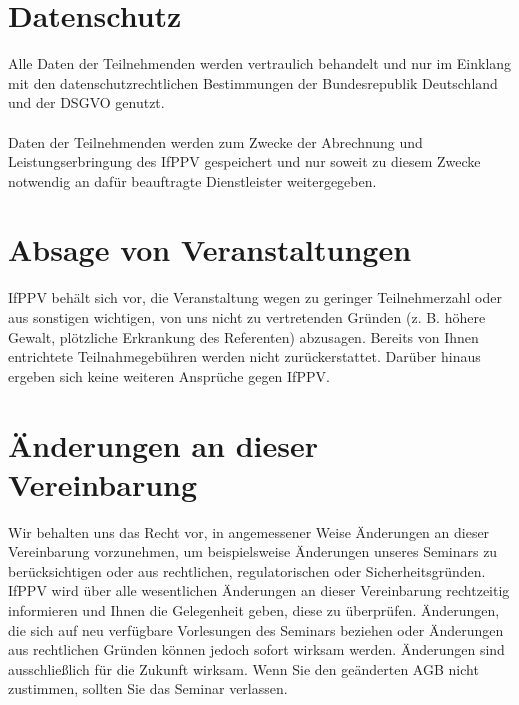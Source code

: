 \documentclass[a4paper, 12pt]{scrartcl}
\begin{document}
    \section{Datenschutz}
    Alle Daten der Teilnehmenden werden vertraulich behandelt und nur im Einklang mit den datenschutzrechtlichen Bestimmungen der Bundesrepublik Deutschland und der DSGVO genutzt. \\ \\ \noindent
    Daten der Teilnehmenden werden zum Zwecke der Abrechnung und Leistungserbringung des IfPPV gespeichert und nur soweit zu diesem Zwecke notwendig an daf\"ur beauftragte Dienstleister weitergegeben.
    \section{Absage von Veranstaltungen}
    IfPPV beh\"alt sich vor, die Veranstaltung wegen zu geringer Teilnehmerzahl oder aus sonstigen wichtigen, von uns nicht zu vertretenden Gr\"unden (z. B. h\"ohere Gewalt, pl\"otzliche Erkrankung des Referenten) abzusagen. Bereits von Ihnen entrichtete Teilnahmegeb\"uhren werden nicht zur\"uckerstattet. Dar\"uber hinaus ergeben sich keine weiteren Anspr\"uche gegen  IfPPV.

    \section{\"Anderungen an dieser Vereinbarung}
    Wir behalten uns das Recht vor, in angemessener Weise \"Anderungen an dieser Vereinbarung vorzunehmen, um beispielsweise \"Anderungen unseres Seminars zu ber\"ucksichtigen oder aus rechtlichen, regulatorischen oder Sicherheitsgr\"unden. IfPPV wird \"uber alle wesentlichen \"Anderungen an dieser Vereinbarung rechtzeitig informieren und Ihnen die Gelegenheit geben, diese zu \"uberpr\"ufen. \"Anderungen, die sich auf neu verf\"ugbare Vorlesungen des Seminars beziehen oder \"Anderungen aus rechtlichen Gr\"unden k\"onnen jedoch sofort wirksam werden. \"Anderungen sind ausschließlich f\"ur die Zukunft wirksam. Wenn Sie den ge\"anderten AGB nicht zustimmen, sollten Sie das Seminar verlassen.
\end{document}
